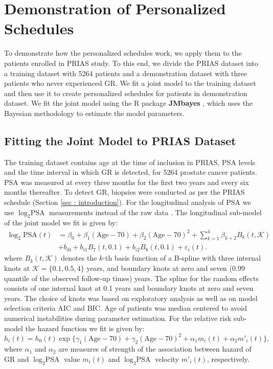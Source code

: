 
\section{Demonstration of Personalized Schedules}
\label{sec : pers_schedule_PRIAS}
To demonstrate how the personalized schedules work, we apply them to the patients enrolled in PRIAS study. To this end, we divide the PRIAS dataset into a training dataset with 5264 patients and a demonstration dataset with three patients who never experienced GR. We fit a joint model to the training dataset and then use it to create personalized schedules for patients in demonstration dataset. We fit the joint model using the R package \textbf{JMbayes} \citep{rizopoulosJMbayes}, which uses the Bayesian methodology to estimate the model parameters.

\subsection{Fitting the Joint Model to PRIAS Dataset}
\label{subsec : jm_fit_prias}
The training dataset contains age at the time of inclusion in PRIAS, PSA levels and the time interval in which GR is detected, for 5264 prostate cancer patients. PSA was measured at every three months for the first two years and every six months thereafter. To detect GR, biopsies were conducted as per the PRIAS schedule (Section \ref{sec : introduction}). For the longitudinal analysis of PSA we use $\log_2 \mbox{PSA}$ measurements instead of the raw data \citep{nieboer2015nonlinear}. The longitudinal sub-model of the joint model we fit is given by:
\begin{equation}
\label{eq : long_model_prias}
\begin{aligned}
\log_2 \mbox{PSA}(t) &= \beta_0 + \beta_1 (\mbox{Age}-70) + \beta_2 (\mbox{Age}-70)^2 + \sum_{k=1}^4 \beta_{k+2} B_k(t,\mathcal{K})\\ 
&+  b_{i0} + b_{i1} B_7(t, 0.1) + b_{i2} B_8(t, 0.1) +
\varepsilon_i(t).
\end{aligned}
\end{equation}
where $B_k(t, \mathcal{K})$ denotes the $k$-th basis function of a B-spline with three internal knots at $\mathcal{K} =\{0.1, 0.5, 4\}$ years, and boundary knots at zero and seven (0.99 quantile of the observed follow-up times) years. The spline for the random effects consists of one internal knot at 0.1 years and boundary knots at zero and seven years. The choice of knots was based on exploratory analysis as well as on model selection criteria AIC and BIC. Age of patients was median centered to avoid numerical instabilities during parameter estimation. For the relative risk sub-model the hazard function we fit is given by:
\begin{equation}
\label{eq : hazard_prias}
h_i(t) = h_0(t) \exp\big\{\gamma_1 (\mbox{Age}-70)  + \gamma_2 (\mbox{Age}-70)^2 + \alpha_1 m_i(t) + \alpha_2 m'_i(t)\big\},
\end{equation}
where $\alpha_1$ and $\alpha_2$ are measures of strength of the association between hazard of GR and $\log_2 \mbox{PSA}$ value $m_i(t)$ and $\log_2 \mbox{PSA}$ velocity $m'_i(t)$, respectively.

